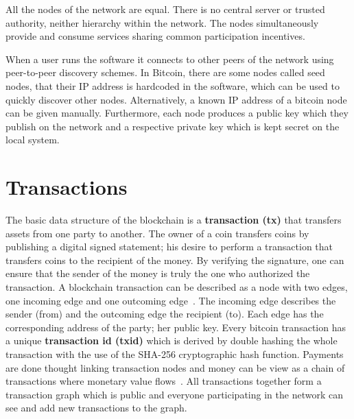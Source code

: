 All the nodes of the network are equal. There is no central server or trusted authority, neither hierarchy within the network. The nodes simultaneously provide and consume services sharing common participation incentives.

When a user runs the software it connects to other peers of the network using peer-to-peer discovery schemes. In Bitcoin, there are some nodes called seed nodes, that their IP address is hardcoded in the software, which can be used to quickly discover other nodes. Alternatively, a known IP address of a bitcoin node can be given manually. Furthermore, each node produces a public key which they publish on the network and a respective private key which is kept secret on the local system.

\section{Transactions}\label{blockchain:structure:tx}

The basic data structure of the blockchain is a \textbf{transaction (tx)} that transfers assets from one party to another. The owner of a coin transfers coins by publishing a digital signed statement; his desire to perform a transaction that transfers coins to the recipient of the money. By verifying the signature, one can ensure that the sender of the money is truly the one who authorized the transaction. A blockchain transaction can be described as a node with two edges, one incoming edge and one outcoming edge~\cite{zindros_thesis}. The incoming edge describes the sender (from) and the outcoming edge the recipient (to). Each edge has the corresponding address of the party; her public key. Every bitcoin transaction has a unique \textbf{transaction id (txid)} which is derived by double hashing the whole transaction with the use of the SHA-256 cryptographic hash function. Payments are done thought linking transaction nodes and money can be view as a chain of transactions where monetary value flows~\cite{zindros_thesis}. All transactions together form a transaction graph which is public and everyone participating in the network can see and add new transactions to the graph.

